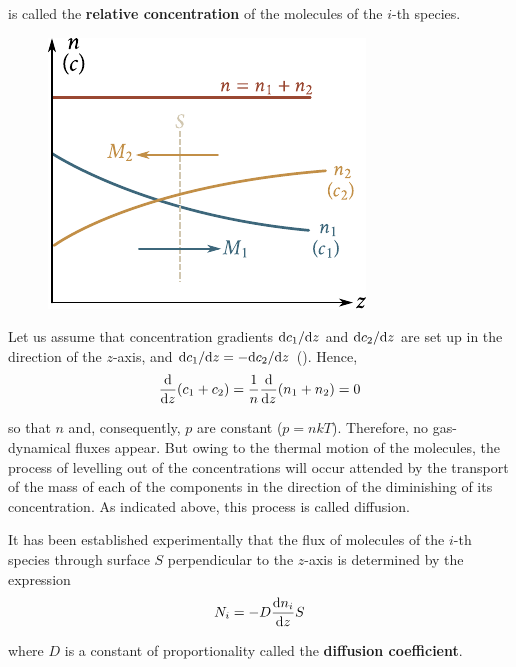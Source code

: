 \noindent
is called the \textbf{relative concentration} of the molecules of the $i$-th species.

\begin{figure}[t]
	\begin{center}
		\includegraphics[scale=1]{figures/ch_16/fig_16_1.pdf}
		\caption[]{}
		\label{fig:16_1}
	\end{center}
	\vspace{-0.8cm}
\end{figure}

Let us assume that concentration gradients $\mathrm{d} c_1/\mathrm{d} z$ and $\mathrm{d} c_2/\mathrm{d} z$ are set up in the direction of the $z$-axis, and $\mathrm{d} c_1/\mathrm{d} z=-\mathrm{d} c_2/\mathrm{d} z$ (). Hence,
\begin{equation*}
    \frac{\mathrm{d}}{\mathrm{d} z}(c_1 + c_2) = \frac{1}{n}\frac{\mathrm{d}}{\mathrm{d} z}(n_1 + n_2) = 0
\end{equation*}

\noindent
so that $n$ and, consequently, $p$ are constant ($p=nkT$). Therefore, no gas-dynamical fluxes appear. But owing to the thermal motion of the molecules, the process of levelling out of the concentrations will occur attended by the transport of the mass of each of the components in the direction of the diminishing of its concentration. As indicated above, this process is called diffusion.

It has been established experimentally that the flux of molecules of the $i$-th species through surface $S$ perpendicular to the $z$-axis is determined by the expression
\begin{equation}\label{eq:16_1}
    N_i = -D \frac{\mathrm{d} n_i}{\mathrm{d} z} S
\end{equation}

\noindent
where $D$ is a constant of proportionality called the \textbf{diffusion coefficient}.

